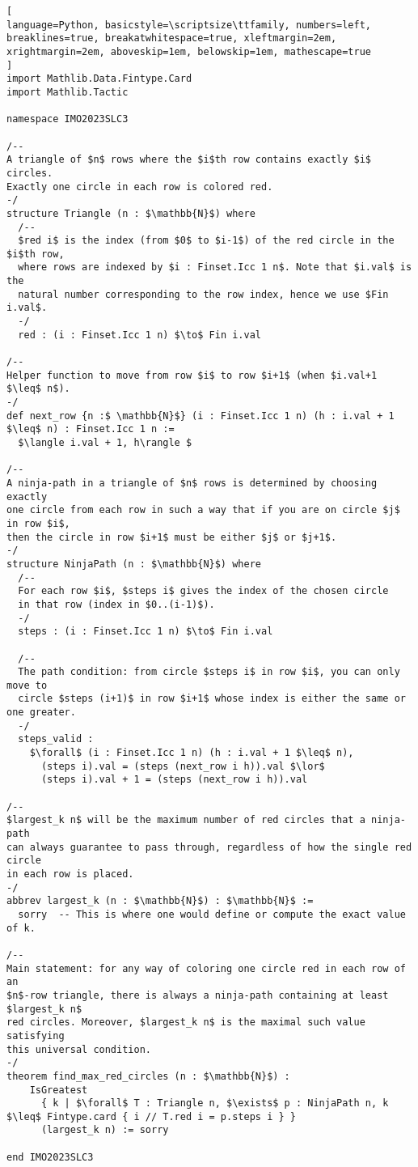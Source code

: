\begin{tcolorbox}[enhanced, breakable, rounded corners,
    colback=green!5!white, colframe=green!75!black,
    colbacktitle=green!85!black, fonttitle=\bfseries, coltitle=white, title=Lean Theorem for 2023 IMO Shortlist Combinatorics Problem 3]
\setlength{\parskip}{1em}
\begin{lstlisting}[
language=Python, basicstyle=\scriptsize\ttfamily, numbers=left, breaklines=true, breakatwhitespace=true, xleftmargin=2em, xrightmargin=2em, aboveskip=1em, belowskip=1em, mathescape=true
]
import Mathlib.Data.Fintype.Card
import Mathlib.Tactic

namespace IMO2023SLC3

/--
A triangle of $n$ rows where the $i$th row contains exactly $i$ circles.
Exactly one circle in each row is colored red.
-/
structure Triangle (n : $\mathbb{N}$) where
  /--
  $red i$ is the index (from $0$ to $i-1$) of the red circle in the $i$th row,
  where rows are indexed by $i : Finset.Icc 1 n$. Note that $i.val$ is the
  natural number corresponding to the row index, hence we use $Fin i.val$.
  -/
  red : (i : Finset.Icc 1 n) $\to$ Fin i.val

/--
Helper function to move from row $i$ to row $i+1$ (when $i.val+1 $\leq$ n$).
-/
def next_row {n :$ \mathbb{N}$} (i : Finset.Icc 1 n) (h : i.val + 1 $\leq$ n) : Finset.Icc 1 n :=
  $\langle i.val + 1, h\rangle $

/--
A ninja-path in a triangle of $n$ rows is determined by choosing exactly
one circle from each row in such a way that if you are on circle $j$ in row $i$,
then the circle in row $i+1$ must be either $j$ or $j+1$.
-/
structure NinjaPath (n : $\mathbb{N}$) where
  /--
  For each row $i$, $steps i$ gives the index of the chosen circle
  in that row (index in $0..(i-1)$).
  -/
  steps : (i : Finset.Icc 1 n) $\to$ Fin i.val

  /--
  The path condition: from circle $steps i$ in row $i$, you can only move to
  circle $steps (i+1)$ in row $i+1$ whose index is either the same or one greater.
  -/
  steps_valid :
    $\forall$ (i : Finset.Icc 1 n) (h : i.val + 1 $\leq$ n),
      (steps i).val = (steps (next_row i h)).val $\lor$
      (steps i).val + 1 = (steps (next_row i h)).val

/--
$largest_k n$ will be the maximum number of red circles that a ninja-path
can always guarantee to pass through, regardless of how the single red circle
in each row is placed.
-/
abbrev largest_k (n : $\mathbb{N}$) : $\mathbb{N}$ :=
  sorry  -- This is where one would define or compute the exact value of k.

/--
Main statement: for any way of coloring one circle red in each row of an
$n$-row triangle, there is always a ninja-path containing at least $largest_k n$
red circles. Moreover, $largest_k n$ is the maximal such value satisfying
this universal condition.
-/
theorem find_max_red_circles (n : $\mathbb{N}$) :
    IsGreatest
      { k | $\forall$ T : Triangle n, $\exists$ p : NinjaPath n, k $\leq$ Fintype.card { i // T.red i = p.steps i } }
      (largest_k n) := sorry

end IMO2023SLC3
\end{lstlisting}
\end{tcolorbox}


